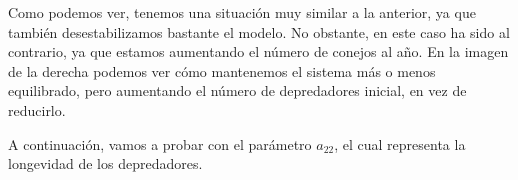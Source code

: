 \documentclass[11pt,a4paper]{article}
\begin{document}
Como podemos ver, tenemos una situación muy similar a la anterior, ya que también desestabilizamos bastante el modelo. No obstante, en este caso
ha sido al contrario, ya que estamos aumentando el número de conejos al año. En la imagen de la derecha podemos ver cómo mantenemos el sistema
más o menos equilibrado, pero aumentando el número de depredadores inicial, en vez de reducirlo.

A continuación, vamos a probar con el parámetro $a_{22}$, el cual representa la longevidad de los depredadores.
\end{document}

